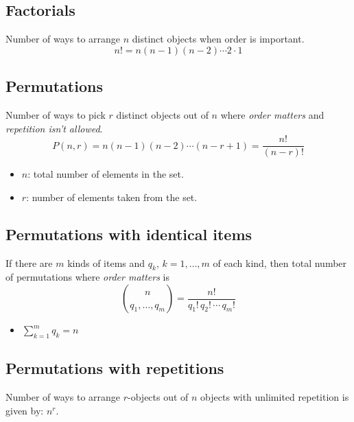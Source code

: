 \documentclass{article}
\begin{document}
\subsection{Factorials}
    \begin{definition}
        Number of ways to arrange $n$ distinct objects when order is important.
        \begin{equation}
            n! = n(n-1)(n-2)\cdots 2\cdot 1
        \end{equation}
    \end{definition}
    
\subsection{Permutations}
    \begin{definition}
        Number of ways to pick $r$ distinct objects out of $n$ where \emph{order matters} and \emph{repetition isn't allowed}.
        \begin{equation}
            P(n,r) = n(n-1)(n-2)\cdots(n-r+1) = \frac{n!}{(n-r)!} 
        \end{equation}
        \begin{itemize}
            \item $n$: total number of elements in the set.
            \item $r$: number of elements taken from the set.
        \end{itemize}
    \end{definition}

\subsection{Permutations with identical items}
    \begin{definition}
        If there are $m$ kinds of items and $q_k$, $k=1,\ldots,m$ of each kind, then total number of permutations where \emph{order matters} is 
        \begin{equation}
            \binom{n}{q_1, \ldots, q_m} = \frac{n!}{q_1! \, q_2! \, \cdots \, q_m!}
        \end{equation}
        \begin{itemize}
            \item $\sum_{k=1}^{m} q_k = n$
        \end{itemize}
    \end{definition}

\subsection{Permutations with repetitions}
    \begin{definition}
        Number of ways to arrange \( r \)-objects out of \( n \) objects with unlimited repetition is given by: $n^r$.
    \end{definition}
\end{document}
